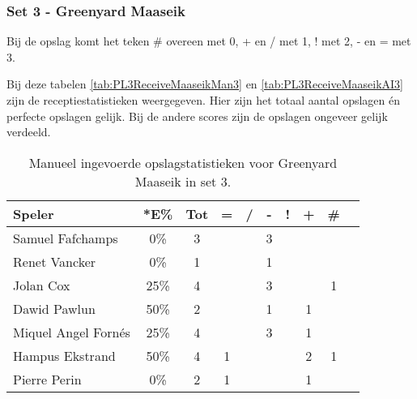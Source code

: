 \subsubsection{Set 3 - Greenyard Maaseik}
\label{sec:PL3_Greenyard3}

Bij de opslag komt het teken \# overeen met 0, + en / met 1, ! met 2, - en = met 3.

Bij deze tabelen \ref{tab:PL3ReceiveMaaseikMan3} en \ref{tab:PL3ReceiveMaaseikAI3} zijn de receptiestatistieken weergegeven. Hier zijn het totaal aantal opslagen én perfecte opslagen gelijk. Bij de andere scores zijn de opslagen ongeveer gelijk verdeeld.

\begin{table}[ht!]
    \centering
    \scriptsize
    \begin{tabular}{|l|c|c|c|c|c|c|c|c|c|} \hline
        \textbf{Speler} & *E\% & Tot & = & / & - & ! & + & \#\\ \hline
        Samuel Fafchamps & 0\% & 3 &  &  & 3 &  &  &  \\ 
        Renet Vancker & 0\% & 1 &  &  & 1 &  &  & \\ 
        Jolan Cox & 25\% & 4 &  &  & 3 &  &  & 1 \\ 
        Dawid Pawlun & 50\% & 2 &  &  & 1 &  & 1 &  \\ 
        Miquel Angel Fornés & 25\% & 4 &  &  & 3 &  & 1 &  \\ 
        Hampus Ekstrand & 50\% & 4 & 1 &  &  &  & 2 & 1 \\ 
        Pierre Perin & 0\% & 2 & 1 &  &  &  & 1 &  \\ \hline
    \end{tabular}
    \caption[Manueel ingevoerde opslagstatistieken voor Greenyard Maaseik in set 3]{\label{tab:PL3ServeMaaseikMan3}Manueel ingevoerde opslagstatistieken voor Greenyard Maaseik in set 3.}
\end{table}

